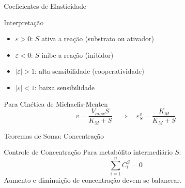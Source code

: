 \begin{frame}[shrink=25]{Coeficientes de Elasticidade}

\vspace{0.3cm}

\begin{exampleblock}{Interpretação}
\begin{itemize}
    \item $\varepsilon > 0$: $S$ ativa a reação (substrato ou ativador)
    \item $\varepsilon < 0$: $S$ inibe a reação (inibidor)
    \item $|\varepsilon| > 1$: alta sensibilidade (cooperatividade)
    \item $|\varepsilon| < 1$: baixa sensibilidade
\end{itemize}
\end{exampleblock}

\vspace{0.3cm}

\begin{block}{Para Cinética de Michaelis-Menten}
\begin{equation*}
v = \frac{V_{max}S}{K_M + S} \quad \Rightarrow \quad \varepsilon_S^v = \frac{K_M}{K_M + S}
\end{equation*}
\end{block}
\end{frame}

\begin{frame}[shrink=10]{Teoremas de Soma: Concentração}
\begin{block}{Controle de Concentração}
Para metabólito intermediário $S$:
\begin{equation*}
\sum_{i=1}^{n} C_i^S = 0
\end{equation*}
Aumento e diminuição de concentração devem se balancear.
\end{block}

\end{frame}

